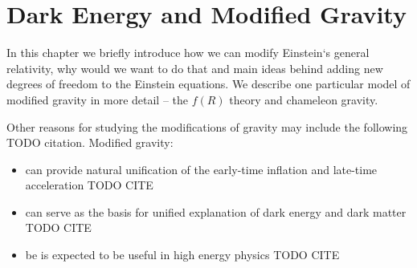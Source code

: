 \chapter{Dark Energy and Modified Gravity}
\label{chpt:de_mg}
In this chapter we briefly introduce how we can modify Einstein`s general relativity, why would we want to do that and main ideas behind adding new degrees of freedom to the Einstein equations. We describe one particular model of modified gravity in more detail -- the $f(R)$ theory and chameleon gravity.

Other reasons for studying the modifications of gravity may include the following TODO citation. Modified gravity:
\begin{itemize}
	\item can provide natural unification of the early-time inflation and late-time acceleration TODO CITE
	\item can serve as the basis for unified explanation of dark energy and dark matter TODO CITE
	\item be is expected to be useful in high energy physics TODO CITE
\end{itemize}







